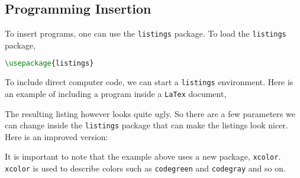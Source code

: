 \documentclass[a4paper, 12pt]{report}
\begin{document}
\begin{center}
\subsection{Programming Insertion}
\begin{comment}
\end{comment}
To insert programs, one can use the \texttt{listings} package. To load the \texttt{listings} package,
\begin{lstlisting}[language=tex]
\usepackage{listings}
\end{lstlisting}
To include direct computer code, we can start a \texttt{listings} environment. Here is an example of including a program inside a \texttt{LaTex} document,

The resulting listing however looks quite ugly. So there are a few parameters we can change inside the \texttt{listings} package that can make the listings look nicer. Here is an improved version:

It is important to note that the example above uses a new package, \texttt{xcolor}. \texttt{xcolor} is used to describe colors such as \texttt{codegreen} and \texttt{codegray} and so on.


\end{center}
\end{document}
